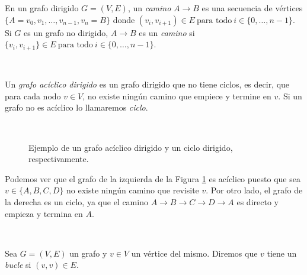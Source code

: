 \documentclass[oneside,openright,titlepage,numbers=noenddot,openany,headinclude,footinclude=true,
cleardoublepage=empty,abstractoff,BCOR=5mm,paper=a4,fontsize=12pt,main=spanish]{scrreprt}
\begin{document}
\begin{definition}[Camino]
En un grafo dirigido $G=(V,E)$, un \textit{camino} $A \to B$ es una secuencia de vértices $\{A = v_0,v_1,\dots,v_{n-1}, v_n = B\}$ donde $(v_i, v_{i+1}) \in E \ \text{para todo} \ i \in
\{0,\dots ,n-1\}$. Si $G$ es un grafo no dirigido, $A\to B$ es un \textit{camino} si $\{v_i,v_{i+1}\} \in E \ \text{para todo} \ i \in \{0,\dots,n-1\}$.
\end{definition}\

\begin{definition}
Un \textit{grafo acíclico dirigido} es un grafo dirigido que no tiene ciclos, es decir, que para cada nodo $v\in V$, no existe ningún camino que empiece y termine en $v$. Si un grafo no es acíclico lo llamaremos \textit{ciclo}.
\end{definition}\

\begin{figure}[h]
\centering
{}
\caption{Ejemplo de un grafo acíclico dirigido y un ciclo dirigido, respectivamente.}
\label{fig:acigraphs}
\end{figure}

\begin{example}
Podemos ver que el grafo de la izquierda de la Figura \ref{fig:acigraphs} es acíclico puesto que sea $v\in \{A,B,C,D\}$ no existe ningún camino que revisite $v$. Por otro lado, el grafo de la derecha es un ciclo, ya que el camino $A\to B \to C \to D \to A$ es directo y empieza y termina en $A$.
\end{example}\

\begin{definition}[Bucle]
Sea $G=(V,E)$ un grafo y $v\in V$ un vértice del mismo. Diremos que $v$ tiene un \textit{bucle} si $(v,v)\in E$.
\end{definition}\
\end{document}
